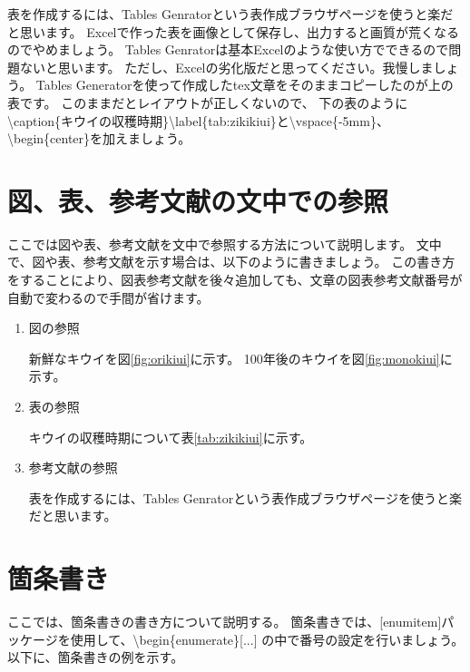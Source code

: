 表を作成するには、Tables Genratorという表作成ブラウザページを使うと楽だと思います。
Excelで作った表を画像として保存し、出力すると画質が荒くなるのでやめましょう。
Tables Genratorは基本Excelのような使い方でできるので問題ないと思います。
ただし、Excelの劣化版だと思ってください。我慢しましょう。
Tables Generatorを使って作成したtex文章をそのままコピーしたのが上の表です。
このままだとレイアウトが正しくないので、
下の表のように\textbackslash caption\{キウイの収穫時期\}\textbackslash label\{tab:zikikiui\}と\textbackslash vspace\{-5mm\}、
\textbackslash begin\{center\}を加えましょう。

\newpage

\section{図、表、参考文献の文中での参照}

ここでは図や表、参考文献を文中で参照する方法について説明します。
文中で、図や表、参考文献を示す場合は、以下のように書きましょう。
この書き方をすることにより、図表参考文献を後々追加しても、文章の図表参考文献番号が自動で変わるので手間が省けます。

\begin{enumerate}
    \item 図の参照
    
        新鮮なキウイを図\ref{fig:orikiui}に示す。
        100年後のキウイを図\ref{fig:monokiui}に示す。
    
    \item 表の参照
    
        キウイの収穫時期について表\ref{tab:zikikiui}に示す。
    
    \item 参考文献の参照

        表を作成するには、Tables Genratorという表作成ブラウザページを使うと楽だと思います\cite{TablesGenerator}。

\end{enumerate}

\section{箇条書き}

ここでは、箇条書きの書き方について説明する。
箇条書きでは、[enumitem]パッケージを使用して、\textbackslash begin\{enumerate\}[...] の中で番号の設定を行いましょう。
以下に、箇条書きの例を示す。

